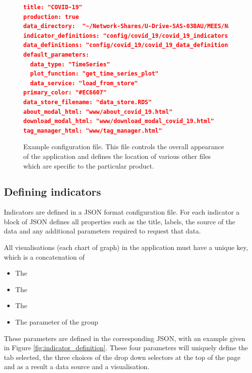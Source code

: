 \documentclass[12pt]{article}
\begin{document}
\begin{figure}
\footnotesize
\begin{lstlisting}[language=json,firstnumber=1]
title: "COVID-19"
production: true
data_directory:  "~/Network-Shares/U-Drive-SAS-03BAU/MEES/National Accounts/COVID-19 data_Secure/COVID-19_dashboard/"
indicator_definitions: "config/covid_19/covid_19_indicators.json"
data_definitions: "config/covid_19/covid_19_data_definitions.json"
default_parameters:
  data_type: "TimeSeries"
  plot_function: "get_time_series_plot"
  data_service: "load_from_store"
primary_color: "#EC6607"
data_store_filename: "data_store.RDS"
about_modal_html: "www/about_covid_19.html"
download_modal_html: "www/download_modal_covid_19.html"
tag_manager_html: "www/tag_manager.html"
\end{lstlisting}
\caption{Example configuration file.  This file controls the overall appearance of the application and defines the location of various other files which are specific to the particular product.}\label{fig:config_file}
\end{figure}

\subsection{Defining indicators}\label{sec:indicator_definition}

Indicators are defined in a JSON format configuration file.  For each indicator a block of JSON defines all properties such as the title, labels, the source of the data and any additional parameters required to request that data.

All visualisations (each chart of graph) in the application must have a unique key, which is a concatenation of
\begin{itemize}
\item The 
\item The 
\item The 
\item The  parameter of the group
\end{itemize}
These parameters are defined in the corresponding JSON, with an example given in Figure \ref{fig:indicator_definition}.  These four parameters will uniquely define the tab selected, the three choices of the drop down selectors at the top of the page and as a result a data source and a visualisation.
\end{document}
